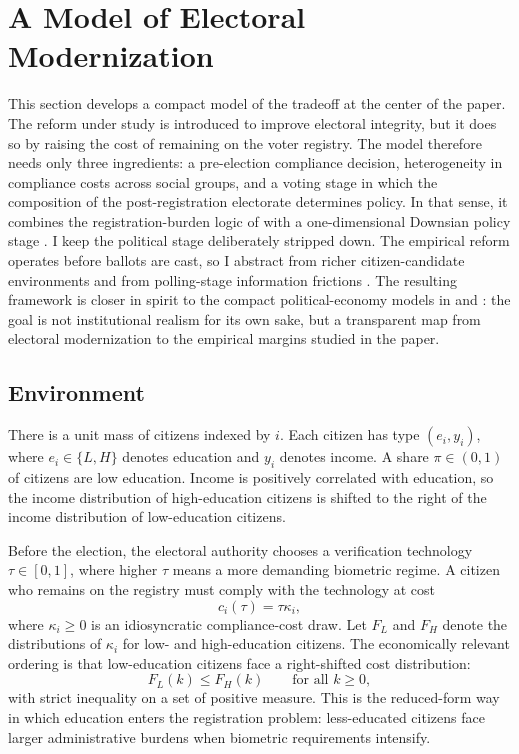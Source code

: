 \section{A Model of Electoral Modernization}
\label{sec:model}

This section develops a compact model of the tradeoff at the center of the paper. The reform under study is introduced to improve electoral integrity, but it does so by raising the cost of remaining on the voter registry. The model therefore needs only three ingredients: a pre-election compliance decision, heterogeneity in compliance costs across social groups, and a voting stage in which the composition of the post-registration electorate determines policy. In that sense, it combines the registration-burden logic of \citet{rosenstoneWolfinger1978} with a one-dimensional Downsian policy stage \citep{downs1957,meltzerRichard1981}. I keep the political stage deliberately stripped down. The empirical reform operates before ballots are cast, so I abstract from richer citizen-candidate environments \citep{besleyCoate1997} and from polling-stage information frictions \citep{feddersenPesendorfer1996}. The resulting framework is closer in spirit to the compact political-economy models in \citet{fujiwara2015} and \citet{besleyPersson2011}: the goal is not institutional realism for its own sake, but a transparent map from electoral modernization to the empirical margins studied in the paper.

\subsection{Environment}

There is a unit mass of citizens indexed by $i$. Each citizen has type $(e_i,y_i)$, where $e_i \in \{L,H\}$ denotes education and $y_i$ denotes income. A share $\pi \in (0,1)$ of citizens are low education. Income is positively correlated with education, so the income distribution of high-education citizens is shifted to the right of the income distribution of low-education citizens.

Before the election, the electoral authority chooses a verification technology $\tau \in [0,1]$, where higher $\tau$ means a more demanding biometric regime. A citizen who remains on the registry must comply with the technology at cost
\begin{equation}
\label{eq:model-cost}
c_i(\tau)=\tau \kappa_i,
\end{equation}
where $\kappa_i \geq 0$ is an idiosyncratic compliance-cost draw. Let $F_L$ and $F_H$ denote the distributions of $\kappa_i$ for low- and high-education citizens. The economically relevant ordering is that low-education citizens face a right-shifted cost distribution:
\begin{equation}
\label{eq:model-cost-ordering}
F_L(k)\leq F_H(k) \qquad \text{for all } k \geq 0,
\end{equation}
with strict inequality on a set of positive measure. This is the reduced-form way in which education enters the registration problem: less-educated citizens face larger administrative burdens when biometric requirements intensify.

